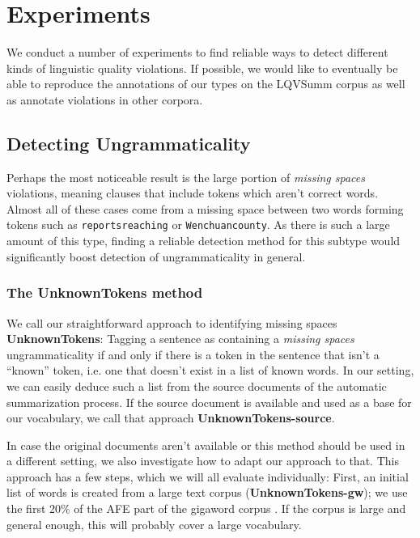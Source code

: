\documentclass[a4paper,10pt]{scrartcl}
\theoremstyle{style}
\begin{document}
\section{Experiments}
\label{experiments}
We conduct a number of experiments to find reliable ways to detect different kinds of linguistic quality violations. If possible, we would like to eventually be able to reproduce the annotations of our types on the LQVSumm corpus as well as annotate violations in other corpora.

\subsection{Detecting Ungrammaticality}
\label{sec_unknowntokens}
Perhaps the most noticeable result is the large portion of \textit{missing spaces} violations, meaning clauses that include tokens which aren't correct words. Almost all of these cases come from a missing space between two words forming tokens such as \texttt{reportsreaching} or \texttt{Wenchuancounty}. As there is such a large amount of this type, finding a reliable detection method for this subtype would significantly boost detection of ungrammaticality in general.

\subsubsection{The UnknownTokens method}
We call our straightforward approach to identifying missing spaces \textbf{UnknownTokens}: Tagging a sentence as containing a \textit{missing spaces} ungrammaticality if and only if there is a token in the sentence that isn't a ``known'' token, i.e. one that doesn't exist in a list of known words. In our setting, we can easily deduce such a list from the source documents of the automatic summarization process. If the source document is available and used as a base for our vocabulary, we call that approach \textbf{UnknownTokens-source}.

In case the original documents aren't available or this method should be used in a different setting, we also investigate how to adapt our approach to that. This approach has a few steps, which we will all evaluate individually:
First, an initial list of words is created from a large text corpus (\textbf{UnknownTokens-gw}); we use the first 20\% of the AFE part of the gigaword corpus \citep{gigaword}. If the corpus is large and general enough, this will probably cover a large vocabulary.
\end{document}
